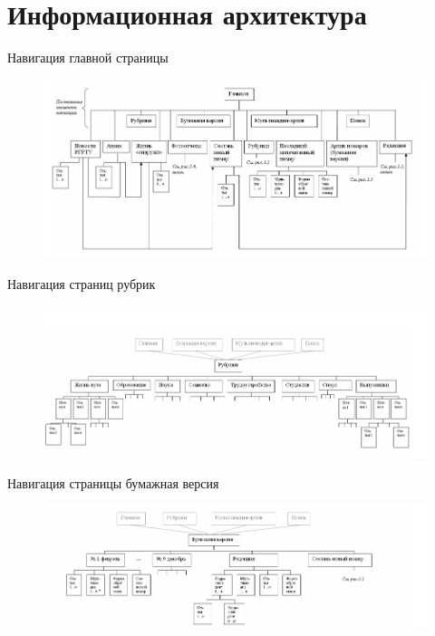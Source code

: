 \documentclass{beamer}
\begin{document}
\section{Информационная архитектура}

\begin{frame}[t]{Навигация главной страницы}
\begin{figure}[h]
\centering
\includegraphics[scale=0.5]{images/lec03-pic15-ex01.png}
\end{figure}
\end{frame}

\begin{frame}[t]{Навигация страниц рубрик}
\begin{figure}[h]
\centering
\includegraphics[scale=0.5]{images/lec03-pic15-ex02.png}
\end{figure}
\end{frame}

\begin{frame}[t]{Навигация страницы бумажная версия}
\begin{figure}[h]
\centering
\includegraphics[scale=0.5]{images/lec03-pic15-ex03.png}
\end{figure}
\end{frame}
\end{document}
